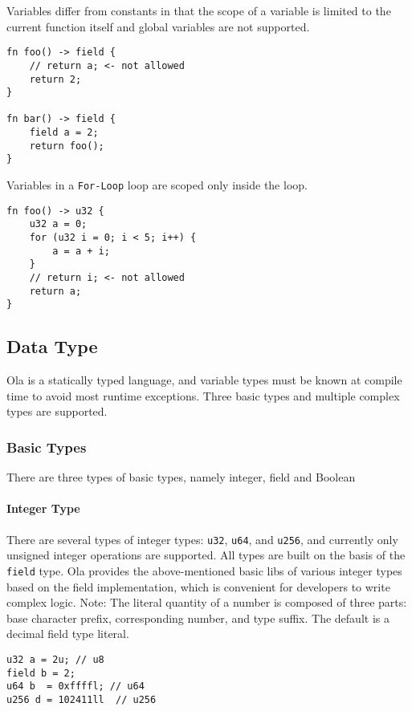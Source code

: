 Variables differ from constants in that the scope of a variable is limited to the current function itself and global variables are not supported.

\begin{lstlisting}
fn foo() -> field {
    // return a; <- not allowed
    return 2;
}

fn bar() -> field {
    field a = 2;
    return foo();
}
\end{lstlisting}

Variables in a \texttt{For-Loop} loop are scoped only inside the loop.

\begin{lstlisting}
fn foo() -> u32 {
    u32 a = 0;
    for (u32 i = 0; i < 5; i++) {
        a = a + i;
    }
    // return i; <- not allowed
    return a;
}
\end{lstlisting}

\subsection{Data Type}

Ola is a statically typed language, and variable types must be known at compile time to avoid most runtime exceptions. 
Three basic types and multiple complex types are supported.

\subsubsection{Basic Types}

There are three types of basic types, namely integer, field and Boolean

\paragraph{Integer Type}

There are several types of integer types: \texttt{u32}, \texttt{u64}, and \texttt{u256}, and currently only unsigned integer operations are supported. 
All types are built on the basis of the \texttt{field} type.
Ola provides the above-mentioned basic libs of various integer types based on the field implementation, which is convenient for developers to write complex logic.
Note: The literal quantity of a number is composed of three parts: base character prefix, corresponding number, and type suffix. The default is a decimal field type literal. 

\begin{verbatim}
u32 a = 2u; // u8
field b = 2;
u64 b  = 0xffffl; // u64
u256 d = 102411ll  // u256
\end{verbatim}

